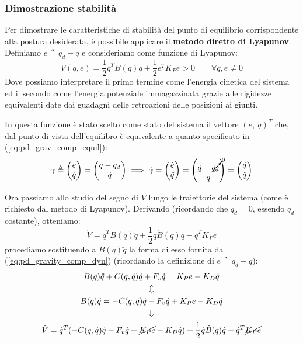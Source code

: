 \vspace*{20pt}
\subsubsection{Dimostrazione stabilità}
\boldmath
Per dimostrare le caratteristiche di stabilità del punto di equilibrio corrispondente alla postura desiderata, è possibile applicare il \textbf{metodo diretto di Lyapunov}. Definiamo $e \triangleq q_d - q$ e consideriamo come funzione di Lyapunov:
$$
V(\dot{q}, e) = \frac{1}{2}\dot{q}^TB(q)\dot{q} + \frac{1}{2}e^TK_Pe > 0    \qquad \forall q,e\neq0
$$
Dove possiamo interpretare il primo termine come l’energia cinetica del sistema ed il secondo come l’energia potenziale immagazzinata grazie alle rigidezze equivalenti date dai guadagni delle retroazioni delle posizioni ai giunti.

In questa funzione è stato scelto come stato del sistema il vettore $(e, \ \dot{q})^T$ che, dal punto di vista dell'equilibro è equivalente a quanto specificato in (\ref{eq:pd_grav_comp_equil}):
\begin{gather*}
\gamma \triangleq \begin{pmatrix}e \\ \dot{q}\end{pmatrix} = \begin{pmatrix}q - q_d \\ \dot{q}\end{pmatrix}
\implies 
\dot{\gamma} = \begin{pmatrix}\dot{e} \\ \ddot{q}\end{pmatrix} = \begin{pmatrix}\dot{q} - \cancelto{0}{\dot{q}_d} \\ \ddot{q}\end{pmatrix} = \begin{pmatrix}\dot{q} \\ \ddot{q}\end{pmatrix}
\end{gather*}


Ora passiamo allo studio del segno di $V$ lungo le traiettorie del sistema (come è richiesto dal metodo di Lyapunov). Derivando (ricordando che $\dot{q}_d = 0$, essendo $q_d$ costante), otteniamo:
$$
\dot{V} = \dot{q}^TB(q)\ddot{q} + \frac{1}{2}\dot{q}\dot{B}(q)\dot{q} - \dot{q}^TK_Pe
$$
procediamo sostituendo a $B(q)\ddot{q}$ la forma di esso fornita da (\ref{eq:pd_gravity_comp_dyn}) (ricordando la definizione di $e \triangleq q_d - q$):
\begin{gather*}
	B(q)\ddot{q} + C(q, \dot{q})\dot{q} + F_v\dot{q} = K_Pe - K_D\dot{q} \\
	\Updownarrow \\
	B(q)\ddot{q} = -C(q, \dot{q})\dot{q} - F_v\dot{q} + K_Pe - K_D\dot{q} \\
	\Downarrow \\
	\dot{V} = \dot{q}^T( -C(q, \dot{q})\dot{q} - F_v\dot{q} + \cancel{K_Pe} - K_D\dot{q} ) + \frac{1}{2}\dot{q}\dot{B}(q)\dot{q} - \dot{q}^T \cancel{K_Pe}
\end{gather*}

